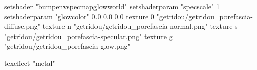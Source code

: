 setshader "bumpenvspecmapglowworld"
setshaderparam "specscale" 1
setshaderparam "glowcolor" 0.0 0.0 0.0
texture 0 "getridou/getridou_porefascia-diffuse.png"
texture n "getridou/getridou_porefascia-normal.png"
texture s "getridou/getridou_porefascia-specular.png"
texture g "getridou/getridou_porefascia-glow.png"

texeffect "metal"
